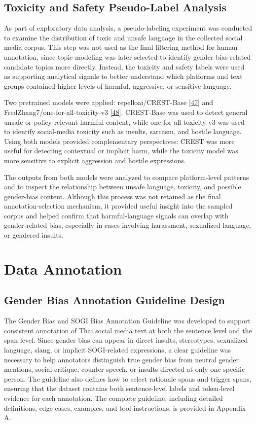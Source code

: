 \documentclass[12pt,oneside,openright,a4paper]{cpe-english-project}
\begin{document}
\subsection{Toxicity and Safety Pseudo-Label Analysis}

As part of exploratory data analysis, a pseudo-labeling experiment was conducted to examine the distribution of toxic and unsafe language in the collected social media corpus. This step was not used as the final filtering method for human annotation, since topic modeling was later selected to identify gender-bias-related candidate topics more directly. Instead, the toxicity and safety labels were used as supporting analytical signals to better understand which platforms and text groups contained higher levels of harmful, aggressive, or sensitive language.

Two pretrained models were applied: repelloai/CREST-Base \hyperlink{bib:ref47}{[47]} and FredZhang7/one-for-all-toxicity-v3 \hyperlink{bib:ref48}{[48]}. CREST-Base was used to detect general unsafe or policy-relevant harmful content, while one-for-all-toxicity-v3 was used to identify social-media toxicity such as insults, sarcasm, and hostile language. Using both models provided complementary perspectives: CREST was more useful for detecting contextual or implicit harm, while the toxicity model was more sensitive to explicit aggression and hostile expressions.

The outputs from both models were analyzed to compare platform-level patterns and to inspect the relationship between unsafe language, toxicity, and possible gender-bias content. Although this process was not retained as the final annotation-selection mechanism, it provided useful insight into the sampled corpus and helped confirm that harmful-language signals can overlap with gender-related bias, especially in cases involving harassment, sexualized language, or gendered insults.


\section{Data Annotation}

\subsection{Gender Bias Annotation Guideline Design}

The Gender Bias and SOGI Bias Annotation Guideline was developed to support consistent annotation of Thai social media text at both the sentence level and the span level. Since gender bias can appear in direct insults, stereotypes, sexualized language, slang, or implicit SOGI-related expressions, a clear guideline was necessary to help annotators distinguish true gender bias from neutral gender mentions, social critique, counter-speech, or insults directed at only one specific person. The guideline also defines how to select rationale spans and trigger spans, ensuring that the dataset contains both sentence-level labels and token-level evidence for each annotation. The complete guideline, including detailed definitions, edge cases, examples, and tool instructions, is provided in Appendix A.
\end{document}
